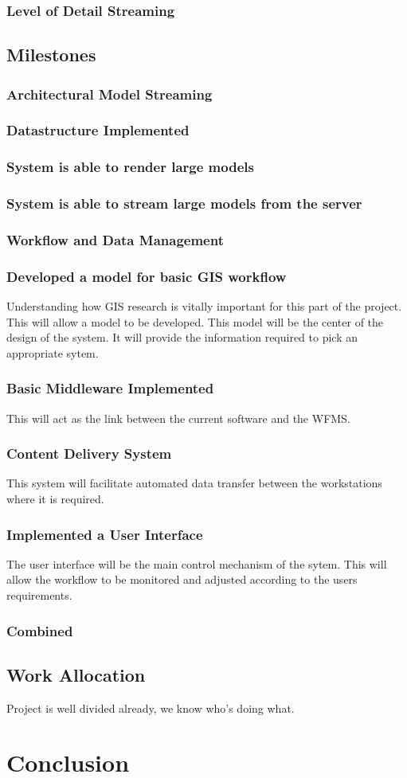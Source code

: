 \documentclass[12pt,a4paper]{article}
\begin{document}
\subsubsection{Level of Detail Streaming}
\subsection{Milestones}
\subsubsection{Architectural Model Streaming}
\subsubsection*{Datastructure Implemented}
\subsubsection*{System is able to render large models}
\subsubsection*{System is able to stream large models from the server}
\subsubsection{Workflow and Data Management}
\subsubsection*{Developed a model for basic GIS workflow}
Understanding how GIS research is vitally important for this part of
the project. This will allow a model to be developed. This model will
be the center of the design of the system. It will provide the
information required to pick an appropriate sytem.
\subsubsection*{Basic Middleware Implemented}
This will act as the link between the current software and the WFMS.
\subsubsection*{Content Delivery System}
This system will facilitate automated data transfer between the workstations
where it is required.
\subsubsection*{Implemented a User Interface}
The user interface will be the main control mechanism of the sytem. This
will allow the workflow to be monitored and adjusted according to the users
requirements.
\subsubsection{Combined}
\subsection{Work Allocation}
Project is well divided already, we know who's doing what.
\section{Conclusion}






\end{document}
